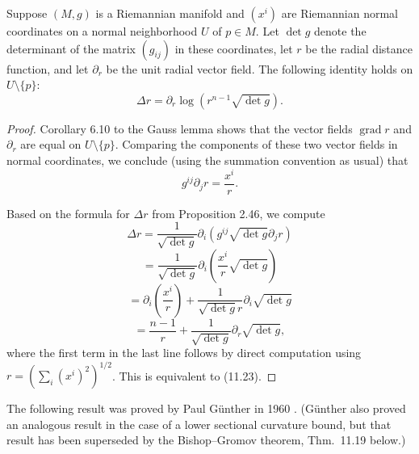 \begin{lemma}
\label{lem:riemannian-volume-laplacian}

Suppose $(M, g)$ is a Riemannian manifold and $(x^i)$ are Riemannian normal coordinates on a normal neighborhood $U$ of $p \in M$. Let $\det g$ denote the determinant of the matrix $(g_{ij})$ in these coordinates, let $r$ be the radial distance function, and let $\partial_r$ be the unit radial vector field. The following identity holds on $U \setminus \{p\}$:
\begin{equation}
\Delta r = \partial_r \log(r^{n-1} \sqrt{\det g}).
\tag{11.23}
\end{equation}

\begin{proof}
Corollary 6.10 to the Gauss lemma shows that the vector fields $\operatorname{grad} r$ and $\partial_r$ are equal on $U \setminus \{p\}$. Comparing the components of these two vector fields in normal coordinates, we conclude (using the summation convention as usual) that
\[
g^{ij} \partial_j r = \frac{x^i}{r}.
\]

Based on the formula for $\Delta r$ from Proposition 2.46, we compute
\[
\Delta r = \frac{1}{\sqrt{\det g}} \partial_i \left( g^{ij} \sqrt{\det g} \partial_j r \right)
\]
\[
= \frac{1}{\sqrt{\det g}} \partial_i \left( \frac{x^i}{r} \sqrt{\det g} \right)
\]
\[
= \partial_i \left( \frac{x^i}{r} \right) + \frac{1}{\sqrt{\det g} r} \partial_i \sqrt{\det g}
\]
\[
= \frac{n-1}{r} + \frac{1}{\sqrt{\det g}} \partial_r \sqrt{\det g},
\]
where the first term in the last line follows by direct computation using $r = \left(\sum_i (x^i)^2\right)^{1/2}$. This is equivalent to (11.23).
\end{proof}
\end{lemma}

The following result was proved by Paul Günther in 1960 \cite{Gun60}. (Günther also proved an analogous result in the case of a lower sectional curvature bound, but that result has been superseded by the Bishop--Gromov theorem, Thm.\ 11.19 below.)

